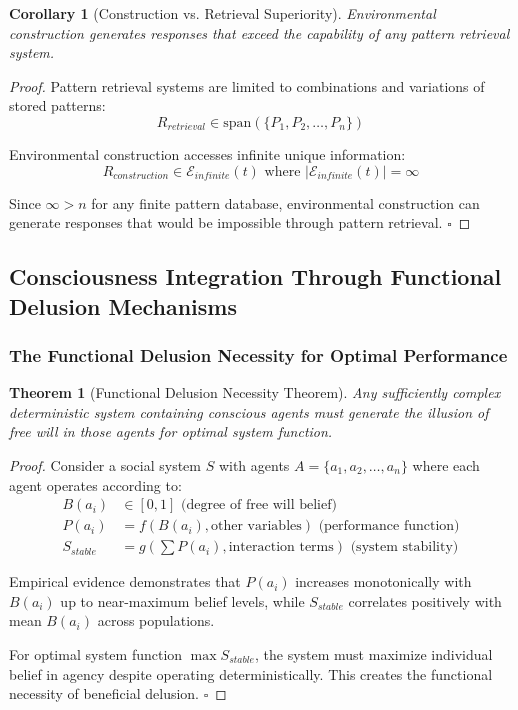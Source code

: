 \documentclass[12pt,a4paper]{article}
\newtheorem{theorem}{Theorem}
\newtheorem{corollary}{Corollary}
\begin{document}
\begin{corollary}[Construction vs. Retrieval Superiority]
Environmental construction generates responses that exceed the capability of any pattern retrieval system.
\end{corollary}

\begin{proof}
Pattern retrieval systems are limited to combinations and variations of stored patterns:
\begin{equation}
R_{retrieval} \in \text{span}(\{P_1, P_2, \ldots, P_n\})
\end{equation}

Environmental construction accesses infinite unique information:
\begin{equation}
R_{construction} \in \mathcal{E}_{infinite}(t) \text{ where } |\mathcal{E}_{infinite}(t)| = \infty
\end{equation}

Since $\infty > n$ for any finite pattern database, environmental construction can generate responses that would be impossible through pattern retrieval. $\square$
\end{proof}

\subsection{Consciousness Integration Through Functional Delusion Mechanisms}

\subsubsection{The Functional Delusion Necessity for Optimal Performance}

\begin{theorem}[Functional Delusion Necessity Theorem]
Any sufficiently complex deterministic system containing conscious agents must generate the illusion of free will in those agents for optimal system function.
\end{theorem}

\begin{proof}
Consider a social system $S$ with agents $A = \{a_1, a_2, \ldots, a_n\}$ where each agent operates according to:
\begin{align}
B(a_i) &\in [0,1] \text{ (degree of free will belief)} \\
P(a_i) &= f(B(a_i), \text{other variables}) \text{ (performance function)} \\
S_{stable} &= g\left(\sum P(a_i), \text{interaction terms}\right) \text{ (system stability)}
\end{align}

Empirical evidence demonstrates that $P(a_i)$ increases monotonically with $B(a_i)$ up to near-maximum belief levels, while $S_{stable}$ correlates positively with mean $B(a_i)$ across populations.

For optimal system function $\max S_{stable}$, the system must maximize individual belief in agency despite operating deterministically. This creates the functional necessity of beneficial delusion. $\square$
\end{proof}
\end{document}
